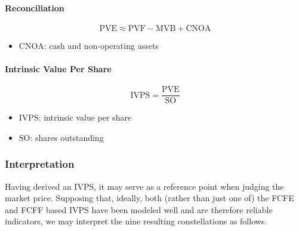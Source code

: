 \paragraph{Reconciliation}

$$
\text{PVE} \approx \text{PVF} - \text{MVB} + \text{CNOA}
$$

\begin{itemize}
  \item[] $\text{CNOA}$: cash and non-operating assets
\end{itemize}

\paragraph{Intrinsic Value Per Share}

$$
\text{IVPS} = \frac{\text{PVE}}{\text{SO}}
$$

\begin{itemize}
  \item[] $\text{IVPS}$: intrinsic value per share
  \item[] $\text{SO}$: shares outstanding
\end{itemize}

\subsubsection{Interpretation}

Having derived an $\text{IVPS}$, it may serve as a reference point when judging the market price. Supposing that, ideally, both (rather than just one of) the FCFE and FCFF based IVPS have been modeled well and are therefore reliable indicators, we may interpret the nine resulting constellations as follows.

\renewcommand{\arraystretch}{1.8}

